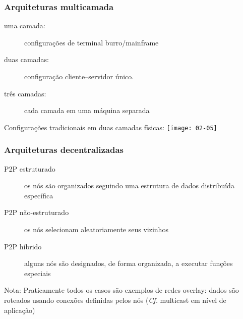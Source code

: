 \documentclass[Ligatures=TeX,table,brazil,svgnames,usetotalslideindicator,compress,10pt]{beamer}
\begin{document}
\begin{frame}
  \frametitle{Arquiteturas multicamada}
  \begin{description}
  \item[\alert{uma camada:}] configurações de terminal burro/mainframe
  \item[\alert{duas camadas:}] configuração cliente--servidor único.
  \item[\alert{três camadas:}] cada camada em uma máquina separada
  \end{description}

  \begin{alertblock}{Configurações tradicionais em duas camadas físicas:}
    \texttt{[image: 02-05]}
  \end{alertblock}

\end{frame}


\begin{frame}
  \frametitle{Arquiteturas decentralizadas}

  \begin{description}
  \item[P2P estruturado] os nós são organizados seguindo uma estrutura de dados distribuída específica
  \item[P2P não-estruturado] os nós selecionam aleatoriamente seus vizinhos
  \item[P2P híbrido] alguns nós são designados, de forma organizada, a
    executar funções especiais
  \end{description}

  \pause
  \begin{alertblock}{Nota:}
    Praticamente todos os casos são exemplos de \alert{redes overlay}: dados são roteados usando conexões definidas pelos nós (\textit{Cf.} multicast em nível de aplicação)
  \end{alertblock}

\end{frame}
\end{document}
